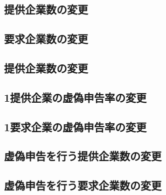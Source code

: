 \hypertarget{ux63d0ux4f9bux4f01ux696dux6570ux306eux5909ux66f4}{%
\subsection{提供企業数の変更}\label{ux63d0ux4f9bux4f01ux696dux6570ux306eux5909ux66f4}}

\hypertarget{ux8981ux6c42ux4f01ux696dux6570ux306eux5909ux66f4}{%
\subsection{要求企業数の変更}\label{ux8981ux6c42ux4f01ux696dux6570ux306eux5909ux66f4}}

\hypertarget{ux63d0ux4f9bux4f01ux696dux6570ux306eux5909ux66f4-1}{%
\subsection{提供企業数の変更}\label{ux63d0ux4f9bux4f01ux696dux6570ux306eux5909ux66f4-1}}

\hypertarget{ux63d0ux4f9bux4f01ux696dux306eux865aux507dux7533ux544aux7387ux306eux5909ux66f4}{%
\subsection{1提供企業の虚偽申告率の変更}\label{ux63d0ux4f9bux4f01ux696dux306eux865aux507dux7533ux544aux7387ux306eux5909ux66f4}}

\hypertarget{ux8981ux6c42ux4f01ux696dux306eux865aux507dux7533ux544aux7387ux306eux5909ux66f4}{%
\subsection{1要求企業の虚偽申告率の変更}\label{ux8981ux6c42ux4f01ux696dux306eux865aux507dux7533ux544aux7387ux306eux5909ux66f4}}

\hypertarget{ux865aux507dux7533ux544aux3092ux884cux3046ux63d0ux4f9bux4f01ux696dux6570ux306eux5909ux66f4}{%
\subsection{虚偽申告を行う提供企業数の変更}\label{ux865aux507dux7533ux544aux3092ux884cux3046ux63d0ux4f9bux4f01ux696dux6570ux306eux5909ux66f4}}

\hypertarget{ux865aux507dux7533ux544aux3092ux884cux3046ux8981ux6c42ux4f01ux696dux6570ux306eux5909ux66f4}{%
\subsection{虚偽申告を行う要求企業数の変更}\label{ux865aux507dux7533ux544aux3092ux884cux3046ux8981ux6c42ux4f01ux696dux6570ux306eux5909ux66f4}}

